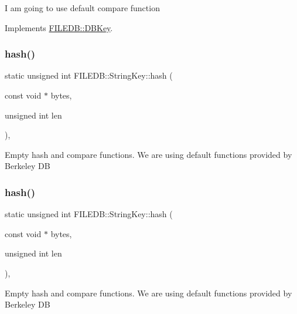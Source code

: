 I am going to use default compare function 

Implements \mbox{\hyperlink{classFILEDB_1_1DBKey_a416c32ba10caf76e6b7ff4986cfc3c05}{F\+I\+L\+E\+D\+B\+::\+D\+B\+Key}}.

\mbox{\label{classFILEDB_1_1StringKey_a505786f9d6a7eec5531eac0f0026d8c3}} 
\subsubsection{\texorpdfstring{hash()}{hash()}\hspace{0.1cm}{\footnotesize\ttfamily [1/2]}}
{\footnotesize\ttfamily static unsigned int F\+I\+L\+E\+D\+B\+::\+String\+Key\+::hash (\begin{DoxyParamCaption}\item[{const void $\ast$}]{bytes,  }\item[{unsigned int}]{len }\end{DoxyParamCaption})\hspace{0.3cm}{\ttfamily [inline]}, {\ttfamily [static]}}

Empty hash and compare functions. We are using default functions provided by Berkeley DB \mbox{\label{classFILEDB_1_1StringKey_a505786f9d6a7eec5531eac0f0026d8c3}} 
\subsubsection{\texorpdfstring{hash()}{hash()}\hspace{0.1cm}{\footnotesize\ttfamily [2/2]}}
{\footnotesize\ttfamily static unsigned int F\+I\+L\+E\+D\+B\+::\+String\+Key\+::hash (\begin{DoxyParamCaption}\item[{const void $\ast$}]{bytes,  }\item[{unsigned int}]{len }\end{DoxyParamCaption})\hspace{0.3cm}{\ttfamily [inline]}, {\ttfamily [static]}}

Empty hash and compare functions. We are using default functions provided by Berkeley DB \mbox{\label{classFILEDB_1_1StringKey_afb2fa99d53c0f4b5aeca0377228ea722}} 
